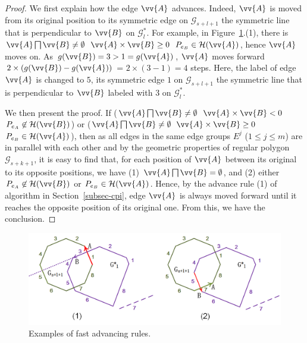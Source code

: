 \begin{proof}
We first explain how the edge $\vv{A}$ advances.
Indeed, $\vv{A}$ is moved from its original position to its symmetric edge on $\mathcal{G}_{s+l+1}$ \wrt the symmetric line that is perpendicular to $\vv{B}$  on $\mathcal{G}^*_{l}$.
For example, in Figure~\ref{fig:r-poly-rule1}.(1), there is $\vv{A} \bigsqcap \vv{B} \ne \emptyset$ \And $\vv{A} \times \vv{B} \ge 0$ \And $P_{e_B} \in \mathcal{H}(\vv{A})$, hence $\vv{A}$ moves on. As $g(\vv{B})=3 > 1=g(\vv{A})$, $\vv{A}$ moves forward $2\times(g(\vv{B}) - g(\vv{A}))$ = $2\times(3-1)= 4$ steps.
Here, the label of edge $\vv{A}$ is changed to $5$, its symmetric edge $1$ on $\mathcal{G}_{s+l+1}$ \wrt the symmetric line that is perpendicular to $\vv{B}$ labeled with $3$  on $\mathcal{G}^*_{l}$.


We then present the proof.
If ($\vv{A} \bigsqcap \vv{B} \ne \emptyset$ \And $\vv{A} \times \vv{B} < 0$ \And $P_{e_A} \not \in \mathcal{H}(\vv{B})$) or ($\vv{A} \bigsqcap \vv{B} \ne \emptyset$ \And $\vv{A} \times \vv{B} \ge 0$ \And $P_{e_B} \in \mathcal{H}(\vv{A})$), then as all edges in the same edge groups $E^j$ ($1\le j\le m$) are in parallel with each other and by the geometric properties of regular polygon $\mathcal{G}_{s+k+1}$, it is easy to find that, for each position of $\vv{A}$ between its original to its opposite positions, we have (1) $\vv{A} \bigsqcap \vv{B} = \emptyset$, and (2) either $P_{e_A} \not \in \mathcal{H}(\vv{B})$ or $P_{e_B} \in \mathcal{H}(\vv{A})$. Hence, by the advance rule (1) of algorithm \cpia in Section~\ref{subsec-cpi}, edge $\vv{A}$ is always moved forward until it reaches the opposite position of its original one. From this, we have the conclusion.
\end{proof}

\begin{figure}[tb!]
	\centering
	\includegraphics[scale=0.82]{figures/Fig-r-poly-rule1.png}
	\vspace{-2ex}
	\caption{\small Examples of fast advancing rules.}
	\vspace{-1.5ex}
	\label{fig:r-poly-rule1}
\end{figure}


